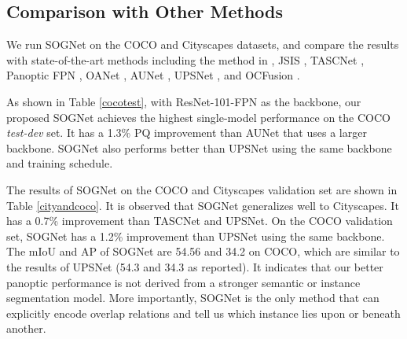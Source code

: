 \documentclass[letterpaper]{article} \usepackage{aaai20}  \usepackage{times}  \usepackage{helvet} \usepackage{courier}  \usepackage[hyphens]{url}  \usepackage{graphicx} \urlstyle{rm} \def\UrlFont{\rm}  \usepackage{graphicx}  \frenchspacing  \setlength{\pdfpagewidth}{8.5in}  \setlength{\pdfpageheight}{11in}
\begin{document}
\subsection{Comparison with Other Methods}







We run SOGNet on the COCO and Cityscapes datasets, and compare the results with state-of-the-art methods including the method in \cite{li2018weakly}, JSIS \cite{de2018panoptic}, TASCNet \cite{li2018learning}, Panoptic FPN \cite{kirillov2019panoptic}, OANet \cite{liu2019end}, AUNet \cite{li2018attention}, UPSNet \cite{xiong2019upsnet}, and OCFusion \cite{lazarow2019learning}.

As shown in Table \ref{cocotest}, with ResNet-101-FPN as the backbone, our proposed SOGNet achieves the highest single-model performance on the COCO \emph{test-dev} set. It has a 1.3\% PQ improvement than AUNet that uses a larger backbone. SOGNet also performs better than UPSNet using the same backbone and training schedule.  





The results of SOGNet on the COCO and Cityscapes validation set are shown in Table \ref{cityandcoco}. It is observed that SOGNet generalizes well to Cityscapes. It has a 0.7\% improvement than TASCNet and UPSNet. On the COCO validation set, SOGNet has a 1.2\% improvement than UPSNet using the same backbone. The mIoU and AP of SOGNet are 54.56 and 34.2 on COCO, which are similar to the results of UPSNet (54.3 and 34.3 as reported). It indicates that our better panoptic performance is not derived from a stronger semantic or instance segmentation model. More importantly, SOGNet is the only method that can explicitly encode overlap relations and tell us which instance lies upon or beneath another. 
\end{document}
